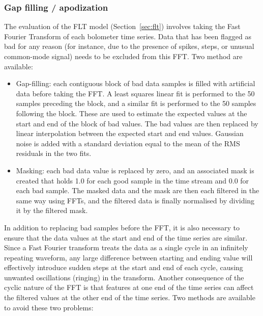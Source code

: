 \documentclass[useAMS,usenatbib,nofootinbib]{mn2e}
\begin{document}
\subsubsection{Gap filling / apodization}
\label{sec:gaps}

The evaluation of the FLT model (Section~\ref{sec:flt}) involves taking
the Fast Fourier Transform of each bolometer time series. Data that has
been flagged as bad for any reason (for instance, due to the presence of
spikes, steps, or unusual common-mode signal) needs to be excluded from
this FFT. Two method are available:

\begin{itemize}
\item Gap-filling: each contiguous block of bad data samples is filled
with artificial data before taking the FFT. A least squares linear fit is
performed to the 50 samples preceding the block, and a similar fit is
performed to the 50 samples following the block. These are used to
estimate the expected values at the start and end of the block of bad
values. The bad values are then replaced by linear interpolation between
the expected start and end values. Gaussian noise is added with a
standard deviation equal to the mean of the RMS residuals in the two
fits.
\item Masking: each bad data value is replaced by zero, and an associated
mask is created that holds 1.0 for each good sample in the time stream and
0.0 for each bad sample. The masked data and the mask are then each filtered
in the same way using FFTs, and the filtered data is finally normalised by
dividing it by the filtered mask.
\end{itemize}

In addition to replacing bad samples before the FFT, it is also necessary
to ensure that the data values at the start and end of the time series
are similar. Since a Fast Fourier transform treats the data as a single
cycle in an infinitely repeating waveform, any large difference between
starting and ending value will effectively introduce sudden steps at the
start and end of each cycle, causing unwanted oscillations (ringing) in
the transform. Another consequence of the cyclic nature of the FFT is
that features at one end of the time series can affect the filtered
values at the other end of the time series. Two methods are available to
avoid these two problems:
\end{document}
